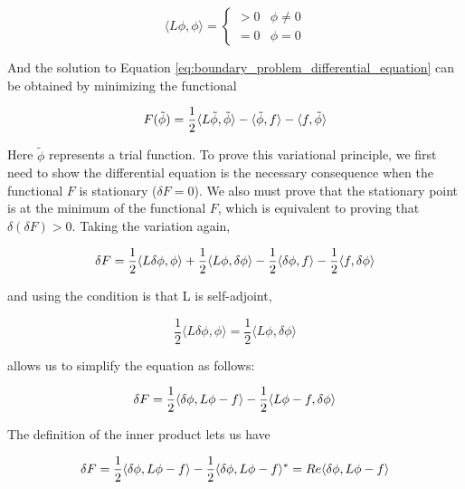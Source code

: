 \documentclass[a4paper,12pt]{report}
\begin{document}
\begin{equation}
  \langle L\phi, \phi\rangle =
  \begin{cases}
    > 0 & \phi \neq 0 \\
    = 0 & \phi = 0
  \end{cases}
\end{equation}

And the solution to Equation \ref{eq:boundary_problem_differential_equation}
can be obtained by minimizing the functional

\begin{equation}
  F(\tilde{\phi}) = \frac{1}{2}\langle L \tilde{\phi}, \tilde{\phi}\rangle \\
  - \langle \tilde{\phi}, f \rangle - \langle f, \tilde{\phi} \rangle
\end{equation}

Here $\tilde{\phi}$ represents a trial function.
To prove this variational principle,
we first need to show the differential equation is the necessary consequence when the functional $F$ is stationary
($\delta F = 0$).
We also must prove that the stationary point is at the minimum of the functional $F$,
which is equivalent to proving that $\delta(\delta F) > 0$.
Taking the variation again,

\begin{equation}
  \delta F = \frac{1}{2}\langle L\delta\phi,\phi \rangle + \frac{1}{2}\langle L\phi,\delta\phi \rangle \\
              - \frac{1}{2}\langle \delta\phi,f \rangle - \frac{1}{2}\langle f, \delta\phi \rangle
\end{equation}

and using the condition is that L is self-adjoint,

\begin{equation}
  \frac{1}{2}\langle L\delta\phi,\phi \rangle = \frac{1}{2}\langle L\phi,\delta\phi \rangle
\end{equation}

allows us to simplify the equation as follows:

\begin{equation}
  \delta F = \frac{1}{2}\langle \delta\phi, L\phi - f \rangle \\
  - \frac{1}{2}\langle L\phi - f, \delta\phi \rangle
\end{equation}

The definition of the inner product lets us have

\begin{equation}
  \delta F = \frac{1}{2}\langle \delta\phi, L\phi - f \rangle \\
  - \frac{1}{2}\langle \delta\phi, L\phi - f \rangle^* \\
  = Re\langle \delta\phi, L\phi-f\rangle
\end{equation}
\end{document}
